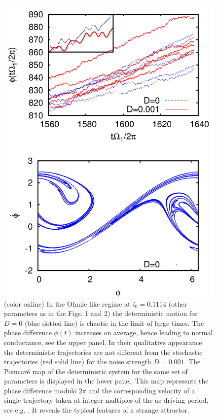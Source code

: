 \documentclass[a4,twocolumn,showpacs,showkeys]{revtex4}
\begin{document}
\begin{figure}
\includegraphics[width=1\linewidth]{fig3} 
\caption{(color online) 
In the Ohmic like regime at $i_0=0.1114$ (other parameters as in the
Figs. 1 and 2) the deterministic motion for $D=0$ (blue dotted line)
is chaotic in the limit of large times. The phase difference $\phi(t)$ 
increases on average, hence leading
to normal conductance, see the upper panel. 
In their qualitative appearance the deterministic trajectories are not
different from the stochastic trajectories (red solid line) 
for the noise strength
$D=0.001$. The Poincar\'e map of the
deterministic system for the same set of parameters is displayed in
the lower panel.  This map represents the 
phase difference modulo $2 \pi$ and the corresponding velocity of a single
trajectory taken at
integer multiples of the ac driving period, see e.g. \cite{Strogatz}.
It reveals the
typical features of a strange attractor.}     
\label{fig3}
\end{figure}
\end{document}
